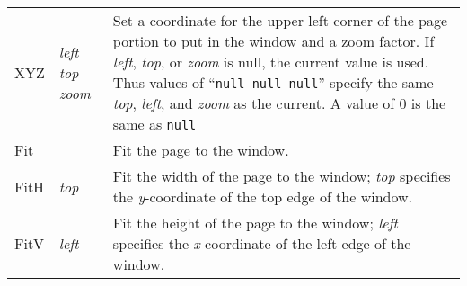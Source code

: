 \clearpage
{

\tablelasttail{}
\begin{center}
\begin{xtabular}{|p{2cm}|p{4cm}|p{6cm}|}
\midrule
XYZ   & \emph{left} \emph{top}                        \emph{zoom} & Set a coordinate for the upper left corner of the   page portion to put in the window and a zoom factor.   If \emph{left}, \emph{top}, or \emph{zoom} is   null, the current value is used. Thus values of  ``\verb|null null null|''   specify the same \emph{top}, \emph{left},   and \emph{zoom} as the current. A value of 0 is the same   as \verb|null| \\
Fit   &                                                           & Fit the page to the window.                                                                                                                                                                                                                                                                                                                                   \\
FitH  & \emph{top}                                                & Fit the width of the page to the window;  \emph{top} specifies the \emph{y}-coordinate of the top  edge of the window.                                                                                                                                                                                                                                        \\
FitV  & \emph{left}                                               & Fit the height of the page to the window; \emph{left} specifies the \emph{x}-coordinate of the left  edge of the window.                                                                                                                                                                                                                                      \\

\end{xtabular}
\end{center}}
